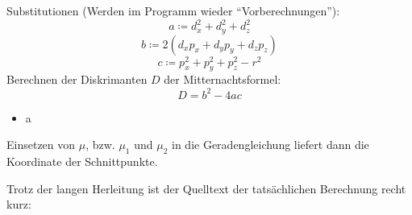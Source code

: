 \documentclass[paper=A4, pagesize, DIV=calc, smallheadings,
fontsize=11pt, expansion=false]{scrreprt}
\begin{document}
Substitutionen (Werden im Programm wieder ``Vorberechnungen''): 
\[a \coloneqq d_x^2 + d_y^2 + d_z^2  \]
\[b \coloneqq 2 (d_xp_x + d_yp_y +d_zp_z )  \]
\[c \coloneqq p_x^2 + p_y^2 + p_z^2 - r^2  \]
Berechnen der Diskrimanten $D$ der Mitternachtsformel:
\[ D =  b^2 - 4ac\]
\begin{itemize}
  \item a
\end{itemize}
Einsetzen von $\mu$, bzw. $\mu_1$ und $\mu_2$ in die Geradengleichung liefert dann die Koordinate der Schnittpunkte.


Trotz der langen Herleitung ist der Quelltext der tatsächlichen Berechnung recht kurz:
\end{document}
